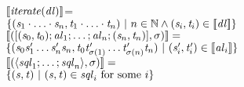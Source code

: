 \documentclass[numbers,10pt,preprint\ifanon ,nocopyrightspace\fi]{sigplanconf}
\begin{document}
\begin{trivlist}
\item 
  $[ \! [\mathit{\mathit{iterate}(\mathit{dl})}] \! ]$=\\
  \hspace*{3em}$\{(\mathit{s}_1\cdot\ldots\cdot\mathit{s}_n,
    \mathit{t}_1\cdot\ldots\cdot\mathit{t}_n)~|~
    n\in\mathbb{N}\wedge(\mathit{s}_i,\mathit{t}_i)\in[ \! [\mathit{dl}] \! ]\}$\\
  $[ \! [([(\mathit{s}_0,\mathit{t}_0);
      \mathit{al}_1;\ldots;\mathit{al}_n
      ;(\mathit{s}_n,\mathit{t}_n)],\sigma)] \! ]=$\\
  \hspace*{3em}$\{
    (\mathit{s}_0\mathit{s}_1'\ldots\mathit{s}_n'\mathit{s}_n,
    \mathit{t}_0\mathit{t}_{\sigma(1)}'\ldots
    \mathit{t}_{\sigma(n)}'\mathit{t}_n)~|~
    (\mathit{s}_i',\mathit{t}_i')\in[ \! [\mathit{al}_i] \! ]\}$\\
  $[ \! [(\langle\mathit{sql}_1;\ldots;
      \mathit{sql}_n\rangle,\sigma)] \! ]=$\\
  \hspace*{3em}$\{(\mathit{s},\mathit{t})~|~
    (\mathit{s},\mathit{t})\in\mathit{sql}_i\text{ for some $i$}\}$
\end{trivlist}

\end{document}
